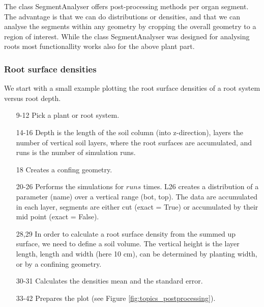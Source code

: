 The class SegmentAnalyser offers post-processing methods per organ segment. The advantage is that we can do distributions or densities, and that we can analyse the segments within any geometry by cropping the overall geometry to a region of interest. While the class SegmentAnalyser was designed for analysing roots most functionallity works also for the above plant part. 

\subsubsection*{Root surface densities}

We start with a small example plotting the root surface densities of a root system versus root depth.



\begin{itemize}
\item[9-12] Pick a plant or root system.
\item[14-16] Depth is the length of the soil column (into z-direction), layers the number of vertical soil layers, where the root surfaces are accumulated, and runs is the number of simulation runs. 
\item[18] Creates a confing geometry.
\item[20-26] Performs the simulations for $runs$ times. L26 creates a distribution of a parameter (name) over a vertical range (bot, top). The data are accumulated in each layer, segments are either cut (exact = True) or accumulated by their mid point (exact = False). 
\item[28,29] In order to calculate a root surface density from the summed up surface, we need to define a soil volume. The vertical height is the layer length, length and width (here 10 cm), can be determined by planting width, or by a confining geometry. 
\item[30-31] Calculates the densities mean and the standard error. 
\item[33-42] Prepares the plot (see Figure \ref{fig:topics_postprocessing}).
\end{itemize}


